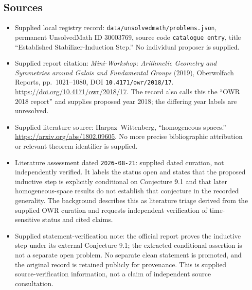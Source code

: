 \documentclass[11pt]{article}
\begin{document}
\subsection{Sources}
\begin{itemize}
\item Supplied local registry record: \texttt{data/unsolvedmath/problems.json}, permanent UnsolvedMath ID \(30003769\), source code \texttt{catalogue entry}, title ``Established Stabilizer-Induction Step.'' No individual proposer is supplied.
\item Supplied report citation: \emph{Mini-Workshop: Arithmetic Geometry and Symmetries around Galois and Fundamental Groups} (2019), Oberwolfach Reports, pp.\ 1021--1080, DOI \texttt{10.4171/owr/2018/17}. \url{https://doi.org/10.4171/owr/2018/17}. The record also calls this the ``OWR 2018 report'' and supplies proposed year 2018; the differing year labels are unresolved.
\item Supplied literature source: Harpaz--Wittenberg, ``homogeneous spaces.'' \url{https://arxiv.org/abs/1802.09605}. No more precise bibliographic attribution or relevant theorem identifier is supplied.
\item Literature assessment dated \texttt{2026-08-21}: supplied dated curation, not independently verified. It labels the status open and states that the proposed inductive step is explicitly conditional on Conjecture 9.1 and that later homogeneous-space results do not establish that conjecture in the recorded generality. The background describes this as literature triage derived from the supplied OWR curation and requests independent verification of time-sensitive status and cited claims.
\item Supplied statement-verification note: the official report proves the inductive step under its external Conjecture 9.1; the extracted conditional assertion is not a separate open problem. No separate clean statement is promoted, and the original record is retained publicly for provenance. This is supplied source-verification information, not a claim of independent source consultation.
\end{itemize}
\end{document}
